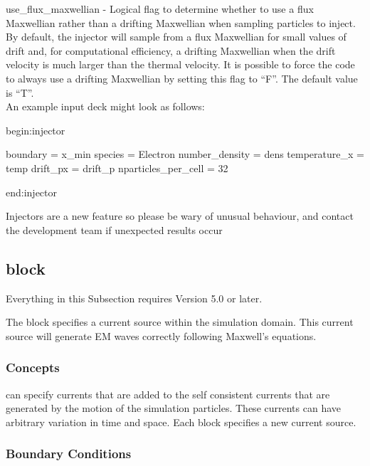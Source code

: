 {\emphtext use\_flux\_maxwellian} - Logical flag to determine whether to use
  a flux Maxwellian rather than a drifting Maxwellian when sampling particles
  to inject. By default, the injector will sample from a flux Maxwellian for
  small values of drift and, for computational efficiency, a drifting
  Maxwellian when the drift velocity is much larger than the thermal velocity.
  It is possible to force the code to always use a drifting Maxwellian by
  setting this flag to ``F''.  The default value is ``T''.\\

An example input deck might look as follows:\\

\begin{boxverbatim}
begin:injector

  boundary = x_min
  species = Electron
  number_density = dens
  temperature_x = temp
  drift_px = drift_p
  nparticles_per_cell = 32

end:injector
\end{boxverbatim}

{\emphtext
Injectors are a new feature so please be wary of unusual behaviour, and
contact the {\EPOCH} development team if unexpected results occur}

\subsection{\texorpdfstring
  { block}
  {           {antenna} block}}
\label{sec:antenna_block}

{\emphtext
Everything in this Subsection requires {\EPOCH} Version 5.0 or later.}

The  block specifies a current source within the simulation
domain. This current source will generate EM waves correctly following Maxwell's
equations.

\subsubsection{Concepts}

{\EPOCH} can specify currents that are added to the self consistent currents
that are generated by the motion of the simulation particles. These currents
can have arbitrary variation in time and space. Each  block
specifies a new current source.

\subsubsection{Boundary Conditions}


